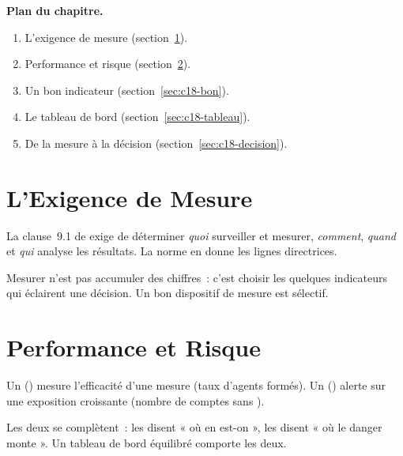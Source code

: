 \medskip
\textbf{Plan du chapitre.}
\begin{enumerate}
    \item L'exigence de mesure (section~\ref{sec:c18-exigence}).
    \item Performance et risque (section~\ref{sec:c18-kpikri}).
    \item Un bon indicateur (section~\ref{sec:c18-bon}).
    \item Le tableau de bord (section~\ref{sec:c18-tableau}).
    \item De la mesure à la décision (section~\ref{sec:c18-decision}).
\end{enumerate}

\separateur

\section{L'Exigence de Mesure}
\label{sec:c18-exigence}

\begin{boxdef}
La clause~9.1 de  exige de déterminer \emph{quoi}
surveiller et mesurer, \emph{comment}, \emph{quand} et \emph{qui} analyse les
résultats. La norme  en donne les lignes directrices.
\end{boxdef}

Mesurer n'est pas accumuler des chiffres~: c'est choisir les quelques
indicateurs qui éclairent une décision. Un bon dispositif de mesure est
sélectif.

\section{Performance et Risque}
\label{sec:c18-kpikri}

\begin{boxdef}
Un  () mesure l'efficacité d'une
mesure (taux d'agents formés). Un  ()
alerte sur une exposition croissante (nombre de comptes sans ).
\end{boxdef}

Les deux se complètent~: les  disent « où en est-on », les
 disent « où le danger monte ». Un tableau de bord équilibré
comporte les deux.

